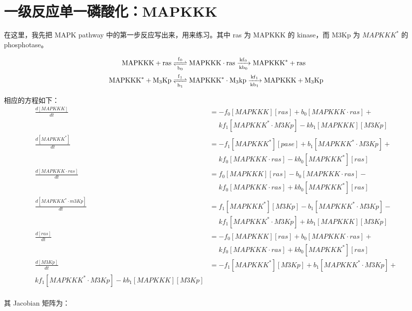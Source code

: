 \section{一级反应单一磷酸化：MAPKKK}
在这里，我先把 MAPK pathway 中的第一步反应写出来，用来练习。其中 ras 为 MAPKKK 的 kinase，而 M3Kp 为 $MAPKKK^{*}$ 的 phosphotase。

\small
\begin{align*}
  \ce{MAPKKK + ras &<=>[f_{0}][b_{0}] MAPKKK\cdot{}ras ->[kf_{0}][kb_{0}] MAPKKK^{*} + ras\\
    MAPKKK^{*} + M3Kp &<=>[f_{1}][b_{1}] MAPKKK^{*}\cdot{}M3kp ->[kf_{1}][kb_{1}] MAPKKK + M3Kp}
\end{align*}
\normalsize

相应的方程如下：
\small
\begin{equation*}
  \begin{align*}
    \frac{d[MAPKKK]}{dt} &= -f_{0}[MAPKKK][ras] + b_{0}[MAPKKK\cdot{}ras] +\\
    &\phantom{=} kf_{1}[MAPKKK^{*}\cdot{}M3Kp] - kb_{1}[MAPKKK][M3Kp]\\
    \frac{d[MAPKKK^{*}]}{dt} &= -f_{1}[MAPKKK^{*}][pase] + b_{1}[MAPKKK^{*}\cdot{}M3Kp] +\\
    &\phantom{=} kf_{0}[MAPKKK\cdot{}ras] - kb_{0}[MAPKKK^{*}][ras] \\
    \frac{d[MAPKKK\cdot{}ras]}{dt} &= f_{0}[MAPKKK][ras] - b_{0}[MAPKKK\cdot{}ras] -\\
    &\phantom{=} kf_{0}[MAPKKK\cdot{}ras] + kb_{0}[MAPKKK^{*}][ras]\\
    \frac{d[MAPKKK^{*}\cdot{}m3Kp]}{dt} &= f_{1}[MAPKKK^{*}][M3Kp] - b_{1}[MAPKKK^{*}\cdot{}M3Kp] -\\
    &\phantom{=} kf_{1}[MAPKKK^{*}\cdot{}M3Kp] + kb_{1}[MAPKKK][M3Kp]\\
    \frac{d[ras]}{dt} &= -f_{0}[MAPKKK][ras] + b_{0}[MAPKKK \cdot{}ras] +\\
    &\phantom{=} kf_{0}[MAPKKK\cdot{}ras] + kb_{0}[MAPKKK^{*}][ras]\\
    \frac{d[M3Kp]}{dt} &= -f_{1}[MAPKKK^{*}][M3Kp] + b_{1}[MAPKKK^{*}\cdot{}M3Kp] +\\
    kf_{1}[MAPKKK^{*}\cdot{}M3Kp] - kb_{1}[MAPKKK][M3Kp]\\
  \end{align*}
\end{equation*}
\normalsize

其 Jacobian 矩阵为：

